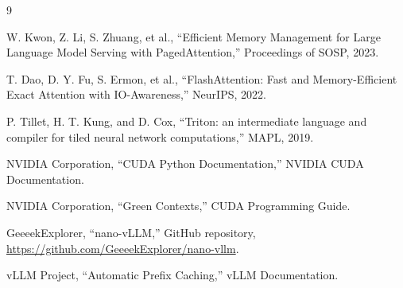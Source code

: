 \documentclass{kcc}
\begin{document}
\begin{thebibliography}{9}

W. Kwon, Z. Li, S. Zhuang, et al., ``Efficient Memory Management for Large Language Model Serving with PagedAttention,'' Proceedings of SOSP, 2023.

T. Dao, D. Y. Fu, S. Ermon, et al., ``FlashAttention: Fast and Memory-Efficient Exact Attention with IO-Awareness,'' NeurIPS, 2022.

P. Tillet, H. T. Kung, and D. Cox, ``Triton: an intermediate language and compiler for tiled neural network computations,'' MAPL, 2019.

NVIDIA Corporation, ``CUDA Python Documentation,'' NVIDIA CUDA Documentation.

NVIDIA Corporation, ``Green Contexts,'' CUDA Programming Guide.

GeeeekExplorer, ``nano-vLLM,'' GitHub repository, \url{https://github.com/GeeeekExplorer/nano-vllm}.

vLLM Project, ``Automatic Prefix Caching,'' vLLM Documentation.

\end{thebibliography}
\end{document}
